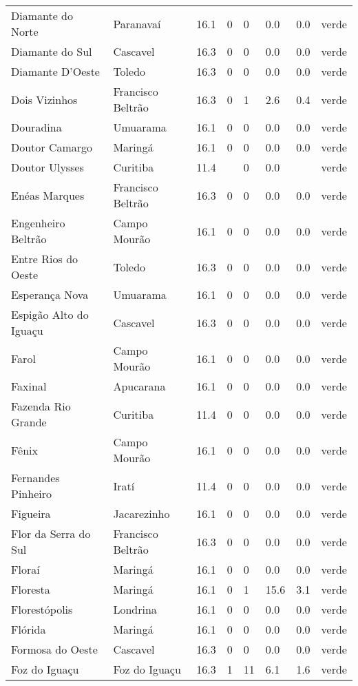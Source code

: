 \begin{longtable}{l|lllllll}
  Diamante do Norte & Paranavaí & 16.1 & 0 & 0 & 0.0 & 0.0 & verde \\ 
  Diamante do Sul & Cascavel & 16.3 & 0 & 0 & 0.0 & 0.0 & verde \\ 
  Diamante D'Oeste & Toledo & 16.3 & 0 & 0 & 0.0 & 0.0 & verde \\ 
  Dois Vizinhos & Francisco Beltrão & 16.3 & 0 & 1 & 2.6 & 0.4 & verde \\ 
  Douradina & Umuarama & 16.1 & 0 & 0 & 0.0 & 0.0 & verde \\ 
  Doutor Camargo & Maringá & 16.1 & 0 & 0 & 0.0 & 0.0 & verde \\ 
  Doutor Ulysses & Curitiba & 11.4 &  & 0 & 0.0 &  & verde \\ 
  Enéas Marques & Francisco Beltrão & 16.3 & 0 & 0 & 0.0 & 0.0 & verde \\ 
  Engenheiro Beltrão & Campo Mourão & 16.1 & 0 & 0 & 0.0 & 0.0 & verde \\ 
  Entre Rios do Oeste & Toledo & 16.3 & 0 & 0 & 0.0 & 0.0 & verde \\ 
  Esperança Nova & Umuarama & 16.1 & 0 & 0 & 0.0 & 0.0 & verde \\ 
  Espigão Alto do Iguaçu & Cascavel & 16.3 & 0 & 0 & 0.0 & 0.0 & verde \\ 
  Farol & Campo Mourão & 16.1 & 0 & 0 & 0.0 & 0.0 & verde \\ 
  Faxinal & Apucarana & 16.1 & 0 & 0 & 0.0 & 0.0 & verde \\ 
  Fazenda Rio Grande & Curitiba & 11.4 & 0 & 0 & 0.0 & 0.0 & verde \\ 
  Fênix & Campo Mourão & 16.1 & 0 & 0 & 0.0 & 0.0 & verde \\ 
  Fernandes Pinheiro & Iratí & 11.4 & 0 & 0 & 0.0 & 0.0 & verde \\ 
  Figueira & Jacarezinho & 16.1 & 0 & 0 & 0.0 & 0.0 & verde \\ 
  Flor da Serra do Sul & Francisco Beltrão & 16.3 & 0 & 0 & 0.0 & 0.0 & verde \\ 
  Floraí & Maringá & 16.1 & 0 & 0 & 0.0 & 0.0 & verde \\ 
  Floresta & Maringá & 16.1 & 0 & 1 & 15.6 & 3.1 & verde \\ 
  Florestópolis & Londrina & 16.1 & 0 & 0 & 0.0 & 0.0 & verde \\ 
  Flórida & Maringá & 16.1 & 0 & 0 & 0.0 & 0.0 & verde \\ 
  Formosa do Oeste & Cascavel & 16.3 & 0 & 0 & 0.0 & 0.0 & verde \\ 
  Foz do Iguaçu & Foz do Iguaçu & 16.3 & 1 & 11 & 6.1 & 1.6 & verde \\ 

\end{longtable}
